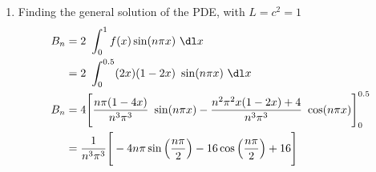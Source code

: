 \begin{enumerate}
    \item Finding the general solution of the PDE, with $ L = c^2 = 1 $
          \begin{align}
              B_n & = 2\ \int_{0}^{1} f(x) \sin (n\pi x)\ \dl x                     \\
                  & = 2\ \int_{0}^{0.5} (2x)(1 - 2x)\ \sin(n\pi x)\ \dl x           \\
              B_n & = 4 \Bigg[ \frac{n\pi (1 - 4x)}{n^3 \pi^3}\ \sin(n\pi x)
              - \frac{n^2\pi^2 x(1-2x) + 4}{n^3 \pi^3}\ \cos(n\pi x) \Bigg]_0^{0.5} \\
                  & = \frac{1}{n^3 \pi^3} \Bigg[ -4n\pi\sin \left( \frac{n\pi}{2}
                  \right) - 16 \cos\left( \frac{n\pi}{2} \right) + 16 \Bigg]
          \end{align}


\end{enumerate}
